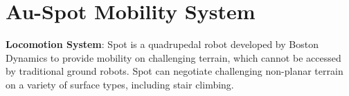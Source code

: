 \documentclass[letterpaper, 10pt, conference]{ieeeconf}      %
\newcommand{\ph}[1]{{\textbf{#1}:}} %
\begin{document}
\section{Au-Spot Mobility System}\label{sec:spot}
\ph{Locomotion System} 
Spot is a quadrupedal robot developed by Boston Dynamics to provide mobility on challenging terrain, which cannot be accessed by traditional ground robots.
Spot can negotiate challenging non-planar terrain on a variety of surface types, including stair climbing.



\end{document}
